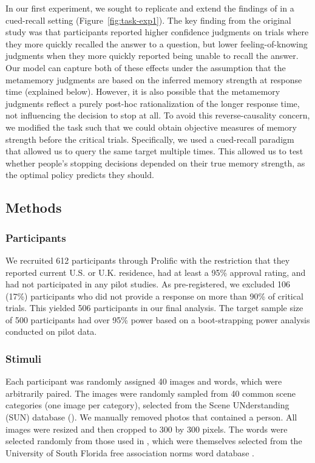 In our first experiment, we sought to replicate and extend the findings of \citet{costermans1992confidence} in a cued-recall setting (Figure~\ref{fig:task-exp1}). The key finding from the original study was that participants reported higher confidence judgments on trials where they more quickly recalled the answer to a question, but lower feeling-of-knowing judgments when they more quickly reported being unable to recall the answer. Our model can capture both of these effects under the assumption that the metamemory judgments are based on the inferred memory strength at response time (explained below). However, it is also possible that the metamemory judgments reflect a purely post-hoc rationalization of the longer response time, not influencing the decision to stop at all. To avoid this reverse-causality concern, we modified the task such that we could obtain objective measures of memory strength before the critical trials. Specifically, we used a cued-recall paradigm that allowed us to query the same target multiple times. This allowed us to test whether people's stopping decisions depended on their true memory strength, as the optimal policy predicts they should.

\subsection{Methods}

\subsubsection{Participants}

We recruited 612 participants through Prolific with the restriction that they reported current U.S. or U.K. residence, had at least a 95\% approval rating, and had not participated in any pilot studies. As pre-registered, we excluded 106 (17\%) participants who did not provide a response on more than 90\% of critical trials. This yielded 506 participants in our final analysis. The target sample size of 500 participants had over 95\% power based on a boot-strapping power analysis conducted on pilot data.

\subsubsection{Stimuli}

Each participant was randomly assigned 40 images and words, which were arbitrarily paired. The images were randomly sampled from 40 common scene categories (one image per category), selected from the Scene UNderstanding (SUN) database (\citealt{5539970}). We manually removed photos that contained a person. All images were resized and then cropped to 300 by 300 pixels. The words were selected randomly from those used in \citet{madan2021exploring}, which were themselves selected from the University of South Florida free association norms word database \citep{nelson2004university}.

